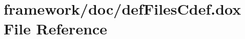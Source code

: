 \hypertarget{def_files_cdef_8dox}{}\section{framework/doc/def\+Files\+Cdef.dox File Reference}
\label{def_files_cdef_8dox}
